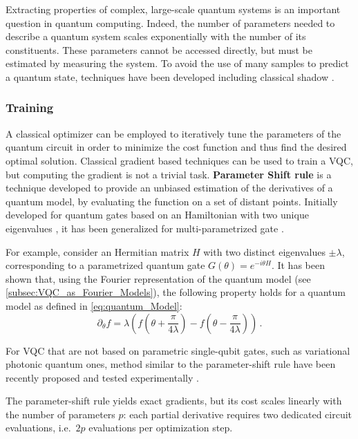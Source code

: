 \documentclass[aps,10pt,groupedaddress,prx,superscriptaddress,twocolumn,balancelastpage, tightenlines]{revtex4-2}
\theoremstyle{plain}  %
\begin{document}
Extracting properties of complex, large-scale quantum systems is an important question in quantum computing. Indeed, the number of parameters needed to describe a quantum system scales exponentially with the number of its constituents. These parameters cannot be accessed directly, but must
be estimated by measuring the system. To avoid the use of many samples to predict a quantum state, techniques have been developed including
classical shadow \cite{aaronson_shadow_2018, huang_predicting_2020, thomas_shedding_2025}.
      
        
\subsubsection{Training}

A classical optimizer can be employed to iteratively tune the parameters of the quantum circuit in order to minimize the cost function and thus find the desired optimal solution. Classical gradient based techniques can be used to train a \gls{VQC}, but computing the gradient is not a trivial task. \textbf{Parameter Shift rule} is a technique developed to provide an unbiased estimation of the derivatives of a quantum model, by evaluating the function on a set of distant points. Initially developed for quantum gates based on an Hamiltonian with two unique eigenvalues \cite{Mitarai_2018_QClearning, Schuld_2019_ParamShift}, it has been generalized for multi-parametrized gate \cite{wierichs_general_2022}. 



For example, consider an Hermitian matrix $H$ with two distinct eigenvalues $\pm \lambda$, corresponding to a parametrized quantum gate $G(\theta) = e^{-i\theta H}$. It has been shown \cite{Schuld_2019_ParamShift} that, using the Fourier representation of the quantum model (see \autoref{subsec:VQC_as_Fourier_Models}), the following property holds for a quantum model as defined in \autoref{eq:quantum_Model}:
\begin{equation}
    \partial_{\theta} f = \lambda \left(f(\theta + \frac{\pi}{4 \lambda}) - f(\theta - \frac{\pi}{4 \lambda})\right) \, .  
\end{equation}

For \gls{VQC} that are not based on parametric single-qubit gates, such as variational photonic quantum ones, method similar to the parameter-shift rule have been recently proposed and tested experimentally \cite{hoch_variational_2025, facelli_exact_2024}.

The parameter-shift rule yields exact gradients, but its cost scales linearly with the number of parameters $p$: each partial derivative requires two dedicated circuit evaluations, i.e.\ $2p$ evaluations per optimization step. 
\end{document}
